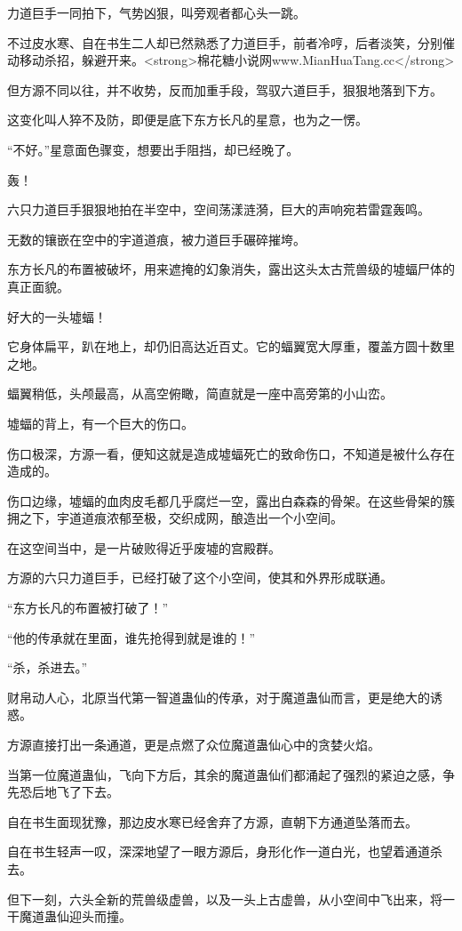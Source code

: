 \begin{this_body}
力道巨手一同拍下，气势凶狠，叫旁观者都心头一跳。

不过皮水寒、自在书生二人却已然熟悉了力道巨手，前者冷哼，后者淡笑，分别催动移动杀招，躲避开来。<strong>棉花糖小说网www.MianHuaTang.cc</strong>

但方源不同以往，并不收势，反而加重手段，驾驭六道巨手，狠狠地落到下方。

这变化叫人猝不及防，即便是底下东方长凡的星意，也为之一愣。

“不好。”星意面色骤变，想要出手阻挡，却已经晚了。

轰！

六只力道巨手狠狠地拍在半空中，空间荡漾涟漪，巨大的声响宛若雷霆轰鸣。

无数的镶嵌在空中的宇道道痕，被力道巨手碾碎摧垮。

东方长凡的布置被破坏，用来遮掩的幻象消失，露出这头太古荒兽级的墟蝠尸体的真正面貌。

好大的一头墟蝠！

它身体扁平，趴在地上，却仍旧高达近百丈。它的蝠翼宽大厚重，覆盖方圆十数里之地。

蝠翼稍低，头颅最高，从高空俯瞰，简直就是一座中高旁第的小山峦。

墟蝠的背上，有一个巨大的伤口。

伤口极深，方源一看，便知这就是造成墟蝠死亡的致命伤口，不知道是被什么存在造成的。

伤口边缘，墟蝠的血肉皮毛都几乎腐烂一空，露出白森森的骨架。在这些骨架的簇拥之下，宇道道痕浓郁至极，交织成网，酿造出一个小空间。

在这空间当中，是一片破败得近乎废墟的宫殿群。

方源的六只力道巨手，已经打破了这个小空间，使其和外界形成联通。

“东方长凡的布置被打破了！”

“他的传承就在里面，谁先抢得到就是谁的！”

“杀，杀进去。”

财帛动人心，北原当代第一智道蛊仙的传承，对于魔道蛊仙而言，更是绝大的诱惑。

方源直接打出一条通道，更是点燃了众位魔道蛊仙心中的贪婪火焰。

当第一位魔道蛊仙，飞向下方后，其余的魔道蛊仙们都涌起了强烈的紧迫之感，争先恐后地飞了下去。

自在书生面现犹豫，那边皮水寒已经舍弃了方源，直朝下方通道坠落而去。

自在书生轻声一叹，深深地望了一眼方源后，身形化作一道白光，也望着通道杀去。

但下一刻，六头全新的荒兽级虚兽，以及一头上古虚兽，从小空间中飞出来，将一干魔道蛊仙迎头而撞。


\end{this_body}
